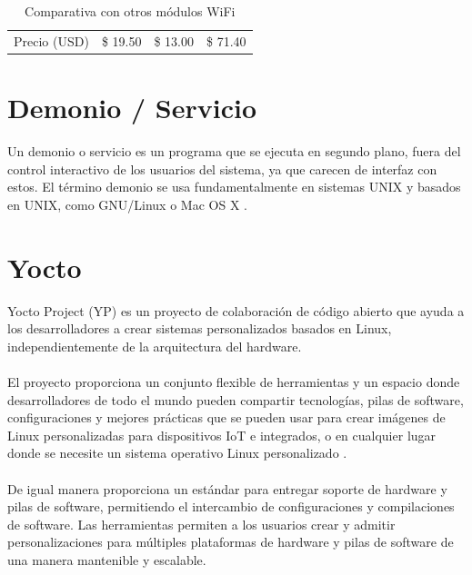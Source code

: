 \begin{longtable}{|M{2.2cm}|M{4.0cm}|M{4.0cm}|M{4.0cm}|}
    Precio (USD) & \$ 19.50 & \$ 13.00 & \$ 71.40
    \hline
	
	\caption{Comparativa con otros módulos WiFi}
	\label{tabla_riesgos}
\end{longtable}

\pagebreak

\paragraph{}





\section{Demonio / Servicio}
Un demonio o servicio es un programa que se ejecuta en segundo plano, fuera del control interactivo de los usuarios del sistema, ya que carecen de interfaz con estos. El término demonio se usa fundamentalmente en sistemas UNIX y basados en UNIX, como GNU/Linux o Mac OS X \citep{MarcoTeorico4}.

\section{Yocto}
Yocto Project (YP) es un proyecto de colaboración de código abierto que ayuda a los desarrolladores a crear sistemas personalizados basados en Linux, independientemente de la arquitectura del hardware.
\paragraph{}
El proyecto proporciona un conjunto flexible de herramientas y un espacio donde desarrolladores de todo el mundo pueden compartir tecnologías, pilas de software, configuraciones y mejores prácticas que se pueden usar para crear imágenes de Linux personalizadas para dispositivos IoT e integrados, o en cualquier lugar donde se necesite un sistema operativo Linux personalizado \citep{MarcoTeoricoYocto}.
\paragraph{}
De igual manera proporciona un estándar para entregar soporte de hardware y pilas de software, permitiendo el intercambio de configuraciones y compilaciones de software. Las herramientas permiten a los usuarios crear y admitir personalizaciones para múltiples plataformas de hardware y pilas de software de una manera mantenible y escalable.
